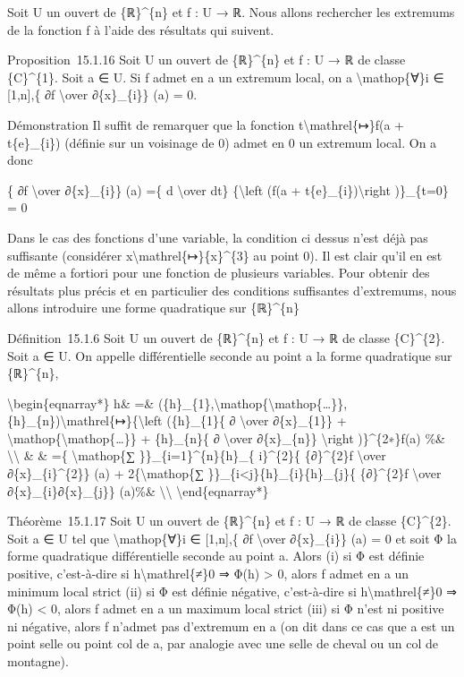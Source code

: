Soit U un ouvert de \{ℝ\}\^{}\{n\} et f : U → ℝ. Nous allons rechercher
les extremums de la fonction f à l'aide des résultats qui suivent.

Proposition~15.1.16 Soit U un ouvert de \{ℝ\}\^{}\{n\} et f : U → ℝ de
classe \{C\}\^{}\{1\}. Soit a ∈ U. Si f admet en a un extremum local, on
a \textbackslash{}mathop\{∀\}i ∈ {[}1,n{]},\{ ∂f \textbackslash{}over
∂\{x\}\_\{i\}\} (a) = 0.

Démonstration Il suffit de remarquer que la fonction
t\textbackslash{}mathrel\{↦\}f(a + t\{e\}\_\{i\}) (définie sur un
voisinage de 0) admet en 0 un extremum local. On a donc

\{ ∂f \textbackslash{}over ∂\{x\}\_\{i\}\} (a) =\{ d
\textbackslash{}over dt\} \{\textbackslash{}left (f(a +
t\{e\}\_\{i\})\textbackslash{}right )\}\_\{t=0\} = 0

Dans le cas des fonctions d'une variable, la condition ci dessus n'est
déjà pas suffisante (considérer
x\textbackslash{}mathrel\{↦\}\{x\}\^{}\{3\} au point 0). Il est clair
qu'il en est de même a fortiori pour une fonction de plusieurs
variables. Pour obtenir des résultats plus précis et en particulier des
conditions suffisantes d'extremums, nous allons introduire une forme
quadratique sur \{ℝ\}\^{}\{n\}

Définition~15.1.6 Soit U un ouvert de \{ℝ\}\^{}\{n\} et f : U → ℝ de
classe \{C\}\^{}\{2\}. Soit a ∈ U. On appelle différentielle seconde au
point a la forme quadratique sur \{ℝ\}\^{}\{n\},

\textbackslash{}begin\{eqnarray*\} h\& =\&
(\{h\}\_\{1\},\textbackslash{}mathop\{\textbackslash{}mathop\{\ldots{}\}\},\{h\}\_\{n\})\textbackslash{}mathrel\{↦\}\{\textbackslash{}left
(\{h\}\_\{1\}\{ ∂ \textbackslash{}over ∂\{x\}\_\{1\}\} +
\textbackslash{}mathop\{\textbackslash{}mathop\{\ldots{}\}\} +
\{h\}\_\{n\}\{ ∂ \textbackslash{}over ∂\{x\}\_\{n\}\}
\textbackslash{}right )\}\^{}\{2∗\}f(a) \%\&
\textbackslash{}\textbackslash{} \& \& =\{ \textbackslash{}mathop\{∑
\}\}\_\{i=1\}\^{}\{n\}\{h\}\_\{ i\}\^{}\{2\}\{ \{∂\}\^{}\{2\}f
\textbackslash{}over ∂\{x\}\_\{i\}\^{}\{2\}\} (a) +
2\{\textbackslash{}mathop\{∑
\}\}\_\{i\textless{}j\}\{h\}\_\{i\}\{h\}\_\{j\}\{ \{∂\}\^{}\{2\}f
\textbackslash{}over ∂\{x\}\_\{i\}∂\{x\}\_\{j\}\} (a)\%\&
\textbackslash{}\textbackslash{} \textbackslash{}end\{eqnarray*\}

Théorème~15.1.17 Soit U un ouvert de \{ℝ\}\^{}\{n\} et f : U → ℝ de
classe \{C\}\^{}\{2\}. Soit a ∈ U tel que \textbackslash{}mathop\{∀\}i ∈
{[}1,n{]},\{ ∂f \textbackslash{}over ∂\{x\}\_\{i\}\} (a) = 0 et soit Φ
la forme quadratique différentielle seconde au point a. Alors (i) si Φ
est définie positive, c'est-à-dire si h\textbackslash{}mathrel\{≠\}0 ⇒
Φ(h) \textgreater{} 0, alors f admet en a un minimum local strict (ii)
si Φ est définie négative, c'est-à-dire si
h\textbackslash{}mathrel\{≠\}0 ⇒ Φ(h) \textless{} 0, alors f admet en a
un maximum local strict (iii) si Φ n'est ni positive ni négative, alors
f n'admet pas d'extremum en a (on dit dans ce cas que a est un point
selle ou point col de a, par analogie avec une selle de cheval ou un col
de montagne).

